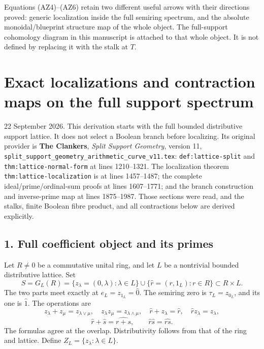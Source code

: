 \documentclass[11pt,a4paper]{article}
\theoremstyle{definition}\newtheorem{definition}[theorem]{Definition}
\begin{document}
Equations (AZ4)--(AZ6) retain two different useful arrows with their
directions proved: generic localization inside the full semiring spectrum,
and the absolute monoidal/blueprint structure map of the whole object.
The full-support cohomology diagram in this manuscript is attached to that
whole object. It is not defined by replacing it with the stalk at $T$.

\section{Exact localizations and contraction maps on the full support
spectrum}\label{exact-localizations-and-contraction-maps-on-the-full-support-spectrum}

22 September 2026. This derivation starts with the full bounded
distributive support lattice. It does not select a Boolean branch before
localizing. Its original provider is \textbf{The Clankers}, \emph{Split
Support Geometry}, version 11,
\nolinkurl{split_support_geometry_arithmetic_curve_v11.tex}:
\nolinkurl{def:lattice-split} and \nolinkurl{thm:lattice-normal-form} at lines
1210--1321.
The localization theorem \nolinkurl{thm:lattice-localization} is at lines 1457--1487; the
complete ideal/prime/ordinal-sum proofs at lines 1607--1771; and the
branch construction and inverse-prime map at lines 1875--1987. Those
sections were read, and the stalks, finite Boolean fibre product, and
all contractions below are derived explicitly.

\subsection{1. Full coefficient object and its
primes}\label{full-coefficient-object-and-its-primes}

Let \(R\ne0\) be a commutative unital ring, and let \(L\) be a
nontrivial bounded distributive lattice. Set \[
 S=G_L(R)=\{z_\lambda=(0,\lambda):\lambda\in L\}
 \cup\{\widehat r=(r,1_L):r\in R\}\subset R\times L.
 \tag{TL1}
\] The two parts meet exactly at \(e_L=z_{1_L}=\widehat0\). The semiring
zero is \(\tau_L=z_{0_L}\), and its one is \(\widehat1\). The operations
are \[
 z_\lambda+z_\mu=z_{\lambda\vee\mu},\quad
 z_\lambda z_\mu=z_{\lambda\wedge\mu},\quad
 \widehat r+z_\lambda=\widehat r,\quad
 \widehat r z_\lambda=z_\lambda,
\] \[
 \widehat r+\widehat s=\widehat{r+s},\qquad
 \widehat r\widehat s=\widehat{rs}.
 \tag{TL2}
\] The formulas agree at the overlap. Distributivity follows from that
of the ring and lattice. Define \(Z_L=\{z_\lambda:\lambda\in L\}\).
\end{document}
